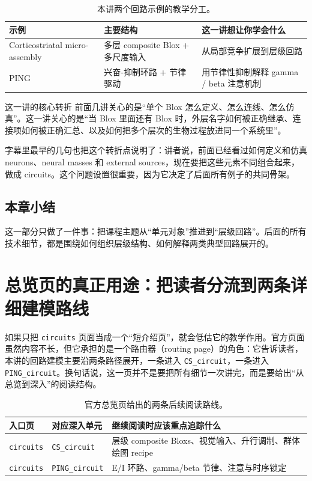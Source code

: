 \documentclass[a4paper]{article}
\begin{document}
\begin{table}[H]
\centering
\begin{tabular}{@{}lll@{}}
\toprule
示例 & 主要结构 & 这一讲想让你学会什么 \\
\midrule
Corticostriatal micro-assembly & 多层 composite Blox + 多尺度输入 & 从局部竞争扩展到层级回路 \\
PING & 兴奋-抑制环路 + 节律驱动 & 用节律性抑制解释 gamma / beta 注意机制 \\
\bottomrule
\end{tabular}
\caption{本讲两个回路示例的教学分工。}
\end{table}

\begin{knowledgebox}{这一讲的核心转折}
前面几讲关心的是“单个 Blox 怎么定义、怎么连线、怎么仿真”。这一讲关心的是“当 Blox 里面还有 Blox 时，外层名字如何被正确继承、连接项如何被正确汇总、以及如何把多个层次的生物过程放进同一个系统里”。
\end{knowledgebox}

字幕里最早的几句也把这个转折点说明了：讲者说，前面已经看过如何定义和仿真 neurons、neural masses 和 external sources，现在要把这些元素不同组合起来，做成 circuits。这个问题设置很重要，因为它决定了后面所有例子的共同骨架。

\subsection{本章小结}
这一部分只做了一件事：把课程主题从“单元对象”推进到“层级回路”。后面的所有技术细节，都是围绕如何组织层级结构、如何解释两类典型回路展开的。

\section{总览页的真正用途：把读者分流到两条详细建模路线}
如果只把 \texttt{circuits} 页面当成一个“短介绍页”，就会低估它的教学作用。官方页面虽然内容不长，但它承担的是一个路由器（routing page）的角色：它告诉读者，本讲的回路建模主要沿两条路径展开，一条进入 \texttt{CS\_circuit}，一条进入 \texttt{PING\_circuit}。换句话说，这一页并不是要把所有细节一次讲完，而是要给出“从总览到深入”的阅读结构。

\begin{table}[H]
\centering
\begin{tabular}{@{}p{}p{}p{}@{}}
\toprule
入口页 & 对应深入单元 & 继续阅读时应该重点追踪什么 \\
\midrule
\texttt{circuits} & \texttt{CS\_circuit} & 层级 composite Bloxs、视觉输入、升行调制、群体绘图 recipe \\
\texttt{circuits} & \texttt{PING\_circuit} & E/I 环路、gamma/beta 节律、注意与时序锁定 \\
\bottomrule
\end{tabular}
\caption{官方总览页给出的两条后续阅读路线。}
\end{table}
\end{document}
